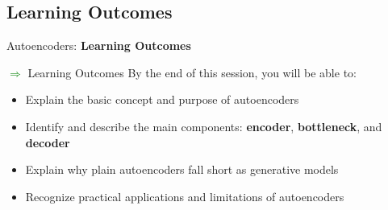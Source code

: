 \subsection{Learning Outcomes}
\begin{frame}{}
    \LARGE Autoencoders: \textbf{Learning Outcomes}
\end{frame}

\begin{frame}[allowframebreaks]{\textcolor{green}{$\Rightarrow$} Learning Outcomes}
    By the end of this session, you will be able to:
    \begin{itemize}
        \item Explain the basic concept and purpose of autoencoders
        \item Identify and describe the main components: \textbf{encoder}, \textbf{bottleneck}, and \textbf{decoder}
        \item Explain why plain autoencoders fall short as generative models
        \item Recognize practical applications and limitations of autoencoders
    \end{itemize}
\end{frame}